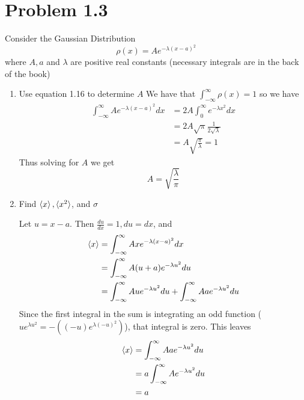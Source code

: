 \documentclass{article}
\begin{document}
\newcommand{\intinf}{\int_{-\infty}^\infty}
\newcommand{\intzinf}{\int_{0}^\infty}

\section{Problem 1.3}
  Consider the Gaussian Distribution
  \[
    \rho(x) = Ae^{-\lambda (x - a)^2}
  \]
  where $A, a$ and $\lambda$ are positive real constants (necessary integrals are in the back of the book)
  \begin{enumerate}[label=(\alph*)]
    \item Use equation 1.16 to determine $A$
      We have that $\intinf \rho(x) = 1$ so we have 
        \begin{align*}
          \intinf Ae^{-\lambda (x - a)^2} dx &= 2A\intzinf e^{-\lambda x^2} dx \\
                                                             &= 2A\sqrt{\pi}\frac1{2\sqrt{\lambda}} \\
                                                             &= A \sqrt{\frac\pi{\lambda}} = 1
        \end{align*}
        Thus solving for $A$ we get
        \[ A = \sqrt{\frac\lambda{\pi}} \]

    \item Find $\braket{x}, \braket{x^2}$, and $\sigma$
     
      Let $u = x-a$. Then $\frac{du}{dx} = 1, du = dx$, and
      \begin{align*}
        \braket{x} &= \intinf Axe^{-\lambda (x - a)^2}dx \\
                   &= \intinf A(u + a)e^{-\lambda u^2}du \\
                   &= \intinf Aue^{-\lambda u^2}du + \intinf Aae^{-\lambda u^2}du \\
      \end{align*}
      Since the first integral in the sum is integrating an odd function ($ue^{\lambda u^2} = -( (-u)e^{\lambda (-u)^2})$), that integral is zero. This leaves
      \begin{align*}
        \braket{x} &= \intinf Aae^{-\lambda u^2}du \\
                   &= a \intinf Ae^{-\lambda u^2}du \\
                   &= a
      \end{align*}
      

\end{enumerate}
\end{document}
